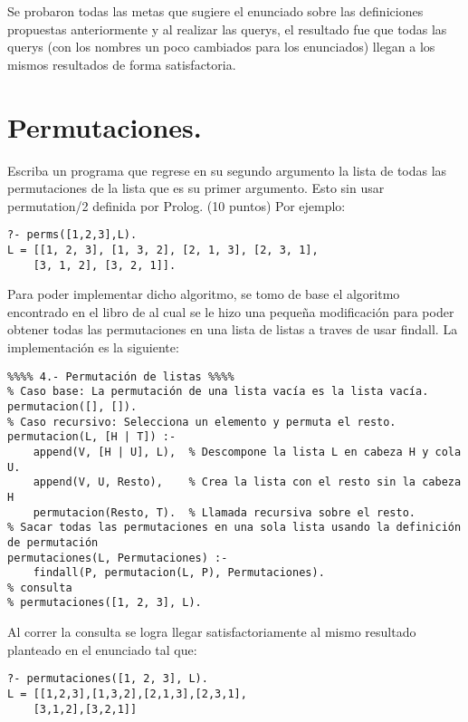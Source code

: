 \documentclass[11pt, letterpaper]{article}
\begin{document}
Se probaron todas las metas que sugiere el enunciado sobre las definiciones propuestas anteriormente y al realizar las querys, el resultado fue que todas las querys (con los nombres un poco cambiados para los enunciados) llegan a los mismos resultados de forma satisfactoria.

\newpage

\section{Permutaciones.}

Escriba un programa que regrese en su segundo argumento la lista de todas las permutaciones de la lista que es su primer argumento. Esto sin usar permutation/2 definida por Prolog. (10 puntos) Por ejemplo:

\begin{lstlisting}
?- perms([1,2,3],L).
L = [[1, 2, 3], [1, 3, 2], [2, 1, 3], [2, 3, 1], 
    [3, 1, 2], [3, 2, 1]].
\end{lstlisting}

Para poder implementar dicho algoritmo, se tomo de base el algoritmo encontrado en el libro de \cite{clock2003} al cual se le hizo una pequeña modificación para poder obtener todas las permutaciones en una lista de listas a traves de usar findall. La implementación es la siguiente:

\begin{lstlisting}
%%%% 4.- Permutación de listas %%%%
% Caso base: La permutación de una lista vacía es la lista vacía.
permutacion([], []).
% Caso recursivo: Selecciona un elemento y permuta el resto.
permutacion(L, [H | T]) :-
    append(V, [H | U], L),  % Descompone la lista L en cabeza H y cola U.
    append(V, U, Resto),    % Crea la lista con el resto sin la cabeza H
    permutacion(Resto, T).  % Llamada recursiva sobre el resto.
% Sacar todas las permutaciones en una sola lista usando la definición de permutación
permutaciones(L, Permutaciones) :-
    findall(P, permutacion(L, P), Permutaciones).
% consulta
% permutaciones([1, 2, 3], L).
\end{lstlisting}

Al correr la consulta se logra llegar satisfactoriamente al mismo resultado planteado en el enunciado tal que:

\begin{lstlisting}
?- permutaciones([1, 2, 3], L).
L = [[1,2,3],[1,3,2],[2,1,3],[2,3,1],
    [3,1,2],[3,2,1]]
\end{lstlisting}
\end{document}
